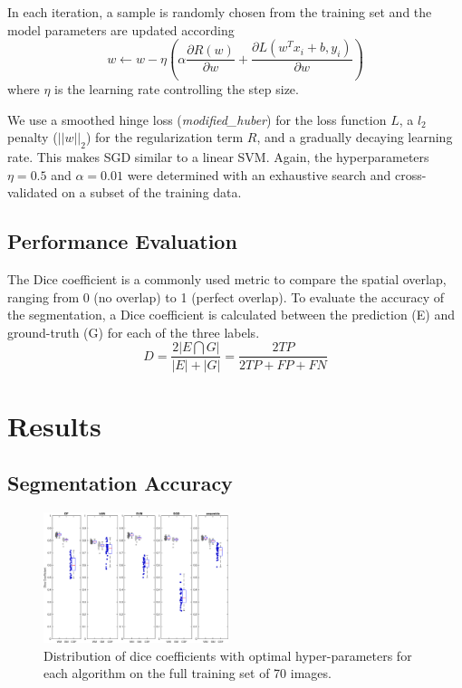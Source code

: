 \documentclass[journal]{IEEEtran}
\begin{document}
In each iteration, a sample is randomly chosen from the training set and the model parameters are updated according
\begin{equation}
w \leftarrow w - \eta \left(\alpha \frac{\partial R(w)}{\partial w} + \frac{\partial L (w^Tx_i + b, y_i)}{\partial w} \right)
\end{equation}
where $\eta$ is the learning rate controlling the step size.

We use a smoothed hinge loss (\textit{modified\_huber}) for the loss function $L$, a $l_2$ penalty ($||w||_2$) for the regularization term $R$, and a gradually decaying learning rate. This makes SGD similar to a linear SVM. Again, the hyperparameters $\eta = 0.5$ and $\alpha = 0.01$ were determined with an exhaustive search and cross-validated on a subset of the training data.


\subsection{Performance Evaluation}\label{ch.eval}
The Dice coefficient is a commonly used metric to compare the spatial overlap, ranging from 0 (no overlap) to 1 (perfect overlap). To evaluate the accuracy of the segmentation, a Dice coefficient is calculated between the prediction (E) and ground-truth (G) for each of the three labels. 
\begin{equation}
D = \frac{2|E \bigcap G|}{|E| + |G|} = \frac{2 TP}{2 TP + FP + FN}
\end{equation}

\section{Results}
\subsection{Segmentation Accuracy}
\begin{figure}
	\centering
	\includegraphics[width=0.48\textwidth]{images/boxplot}
	\caption{Distribution of dice coefficients with optimal hyper-parameters for each algorithm on the full training set of 70 images.}\label{f.boxplot}
\end{figure}
\end{document}
